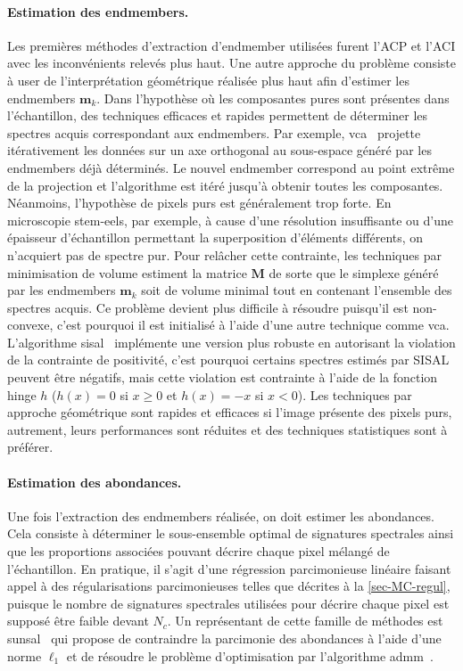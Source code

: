     \paragraph{Estimation des endmembers.} Les premières méthodes d'extraction d'endmember utilisées furent l'ACP et l'ACI avec les inconvénients relevés plus haut.
    Une autre approche du problème consiste à user de l'interprétation géométrique réalisée plus haut afin d'estimer les endmembers $\mathbf{m}_k$. Dans l'hypothèse où les composantes pures sont présentes dans l'échantillon, des techniques efficaces et rapides permettent de déterminer les spectres acquis correspondant aux endmembers. Par exemple, \gls{vca}~\cite{nascimento2005vertex} projette itérativement les données sur un axe orthogonal au sous-espace généré par les endmembers déjà déterminés. Le nouvel endmember correspond au point extrême de la projection et l'algorithme est itéré jusqu'à obtenir toutes les composantes. Néanmoins, l'hypothèse de pixels purs est généralement trop forte. En microscopie \gls{stem}-\gls{eels}, par exemple, à cause d'une résolution insuffisante ou d'une épaisseur d'échantillon permettant la superposition d'éléments différents, on n'acquiert pas de spectre pur. Pour relâcher cette contrainte, les techniques par minimisation de volume estiment la matrice $\mathbf{M}$ de sorte que le simplexe généré par les endmembers $\mathbf{m}_k$ soit de volume minimal tout en contenant l'ensemble des spectres acquis. Ce problème devient plus difficile à résoudre puisqu'il est non-convexe, c'est pourquoi il est initialisé à l'aide d'une autre technique comme \gls{vca}. L'algorithme \gls{sisal}~\cite{bioucas2009variable} implémente une version plus robuste en autorisant la violation de la contrainte de positivité, c'est pourquoi certains spectres estimés par SISAL peuvent être négatifs, mais cette violation est contrainte à l'aide de la fonction hinge $h$ ($h(x) = 0$ si $x \geq 0$ et $h(x)=-x$ si $x<0$). Les techniques par approche géométrique sont rapides et efficaces si l'image présente des pixels purs, autrement, leurs performances sont réduites et des techniques statistiques sont à préférer.
    
    \paragraph{Estimation des abondances.} Une fois l'extraction des endmembers réalisée, on doit estimer les abondances.  Cela consiste à déterminer le sous-ensemble optimal de signatures spectrales ainsi que les proportions associées pouvant décrire chaque pixel mélangé de l'échantillon. En pratique, il s'agit d'une régression parcimonieuse linéaire faisant appel à des régularisations parcimonieuses telles que décrites à la \cref{sec-MC-regul}, puisque le nombre de signatures spectrales utilisées pour décrire chaque pixel est supposé être faible devant $N_c$. Un représentant de cette famille de méthodes est \gls{sunsal}~\cite{bioucas2010alternating} qui propose de contraindre la parcimonie des abondances à l'aide d'une norme $\ell_1$ et de résoudre le problème d'optimisation par l'algorithme \gls{admm}~\cite{eckstein1992douglas, combettes2011proximal}.
    
